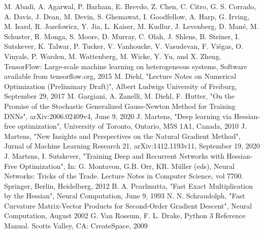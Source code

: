 \documentclass[conference]{IEEEtran}
\begin{document}
\begin{thebibliography}{00}
 M. Abadi, A. Agarwal, P. Barham, E. Brevdo,
Z. Chen, C. Citro, G. S. Corrado, A. Davis,
J. Dean, M. Devin, S. Ghemawat, I. Goodfellow,
A. Harp, G. Irving, M. Isard, R. Jozefowicz, Y. Jia,
L. Kaiser, M. Kudlur, J. Levenberg, D. Mané, M. Schuster,
R. Monga, S. Moore, D. Murray, C. Olah, J. Shlens,
B. Steiner, I. Sutskever, K. Talwar, P. Tucker,
V. Vanhoucke, V. Vasudevan, F. Viégas,
O. Vinyals, P. Warden, M. Wattenberg, M. Wicke,
Y. Yu, and X. Zheng.
TensorFlow: Large-scale machine learning on heterogeneous systems, Software available from tensorflow.org, 2015	
 M. Diehl, "Lecture Notes on Numerical Optimization (Preliminary Draft)", Albert Ludwigs University of Freiburg, September 29, 2017	
 M. Gargiani, A. Zanelli, M. Diehl, F. Hutter, "On the Promise of the Stochastic Generalized Gauss-Newton Method for Training DNNs",  arXiv:2006.02409v4, June 9, 2020 
 J. Martens, "Deep learning via Hessian-free optimization", University of Toronto, Ontario, M5S 1A1, Canada, 2010
 J. Martens, "New Insights and Perspectives on the Natural Gradient Method", Jurnal of Machine Learning Research 21, arXiv:1412.1193v11, September 19, 2020
 J. Martens, I. Sutskever, "Training Deep and Recurrent Networks with Hessian-Free Optimization", In: G. Montavon, G.B. Orr, KR. Müller (eds), Neural Networks: Tricks of the Trade. Lecture Notes in Computer Science, vol 7700. Springer, Berlin, Heidelberg, 2012
 B. A. Pearlmutta, "Fast Exact Multiplication by the Hessian", Neural Computation, June 9, 1993
 N. N. Schraudolph, "Fast Curvature Matrix-Vector Products for Second-Order
Gradient Descent", Neural Computation, August 2002
 G. Van Rossum, F. L. Drake, Python 3 Reference Manual. Scotts Valley, CA: CreateSpace, 2009
\end{thebibliography}

\end{document}
